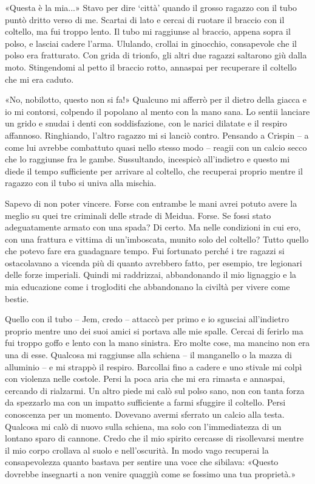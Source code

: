 «Questa è la mia...» Stavo per dire `città' quando il grosso ragazzo con
il tubo puntò dritto verso di me. Scartai di lato e cercai di ruotare il
braccio con il coltello, ma fui troppo lento. Il tubo mi raggiunse al
braccio, appena sopra il polso, e lasciai cadere l'arma. Ululando,
crollai in ginocchio, consapevole che il polso era {fratturato}. Con
grida di trionfo, gli altri due ragazzi saltarono giù dalla moto.
Stingendomi al petto il braccio rotto, annaspai per recuperare il
coltello che mi era caduto.

«No, nobilotto, questo non si fa!» Qualcuno mi afferrò per il dietro
della giacca e io mi contorsi, colpendo il popolano al mento con la mano
sana. Lo sentii lanciare un grido e snudai i denti con soddisfazione,
con le narici dilatate e il respiro affannoso. Ringhiando, l'altro
ragazzo mi si lanciò contro. Pensando a Crispin -- a come lui avrebbe
combattuto quasi nello stesso modo -- reagii con un calcio secco che lo
raggiunse fra le gambe. Sussultando, incespicò all'indietro e questo mi
diede il tempo sufficiente per arrivare al coltello, che recuperai
proprio mentre il ragazzo con il tubo si univa alla mischia.

Sapevo di non poter vincere. Forse con entrambe le mani avrei potuto
avere la meglio su quei tre criminali delle strade di Meidua. Forse. Se
fossi stato adeguatamente armato con una spada? Di certo. Ma nelle
condizioni in cui ero, con una frattura e vittima di un'imboscata,
munito solo del coltello? Tutto quello che potevo fare era guadagnare
tempo. Fui fortunato perché i tre ragazzi si ostacolavano a vicenda più
di quanto avrebbero fatto, per esempio, tre legionari delle forze
imperiali. Quindi mi raddrizzai, abbandonando il mio lignaggio e la mia
educazione come i trogloditi che abbandonano la civiltà per vivere come
bestie.

Quello con il tubo -- Jem, credo -- attaccò per primo e io sgusciai
all'indietro proprio mentre uno dei suoi amici si portava alle mie
spalle. Cercai di ferirlo ma fui troppo goffo e lento con la mano
sinistra. Ero molte cose, ma mancino non era una di esse. Qualcosa mi
raggiunse alla schiena -- il manganello o la mazza di alluminio -- e mi
strappò il respiro. Barcollai fino a cadere e uno stivale mi colpì con
violenza nelle costole. Persi la poca aria che mi era rimasta e
annaspai, cercando di rialzarmi. Un altro piede mi calò sul polso sano,
non con tanta forza da spezzarlo ma con un impatto sufficiente a farmi
sfuggire il coltello. Persi conoscenza per un momento. Dovevano avermi
sferrato un calcio alla testa. Qualcosa mi calò di nuovo sulla schiena,
ma solo con l'immediatezza di un lontano sparo di cannone. Credo che il
mio spirito cercasse di risollevarsi mentre il mio corpo crollava al
suolo e nell'oscurità. In modo vago recuperai la consapevolezza quanto
bastava per {sentire} una voce che sibilava: «Questo dovrebbe insegnarti
a non venire quaggiù come se fossimo una tua proprietà.»

